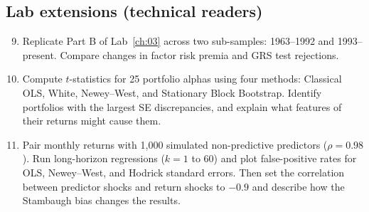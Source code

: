 \subsection*{Lab extensions (technical readers)}
\begin{enumerate}
  \setcounter{enumi}{8}
  \item Replicate Part B of Lab~\ref{ch:03} across two sub-samples: 1963--1992 and 1993--present. Compare changes in factor risk premia and GRS test rejections.
  \item Compute $t$-statistics for 25 portfolio alphas using four methods: Classical OLS, White, Newey--West, and Stationary Block Bootstrap. Identify portfolios with the largest SE discrepancies, and explain what features of their returns might cause them.
  \item Pair monthly returns with 1,000 simulated non-predictive predictors ($\rho = 0.98$). Run long-horizon regressions ($k=1$ to $60$) and plot false-positive rates for OLS, Newey--West, and Hodrick standard errors. Then set the correlation between predictor shocks and return shocks to $-0.9$ and describe how the Stambaugh bias changes the results.
\end{enumerate}

